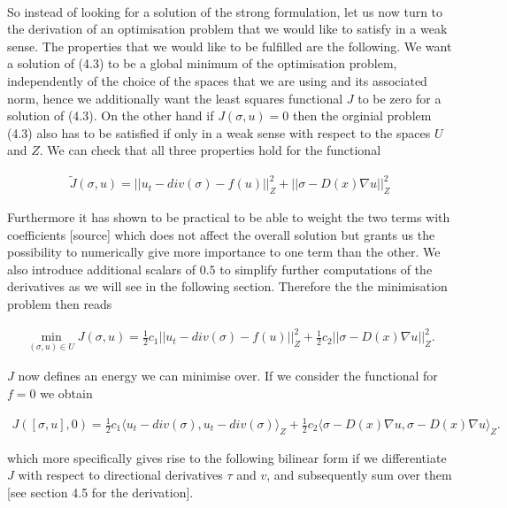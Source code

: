 \documentclass[../draft_1.tex]{subfiles}
\begin{document}
\smallskip
\\
So instead of looking for a solution of the strong formulation, let us now turn to the derivation of an optimisation problem that we would like to satisfy in a weak sense. The properties that we would like to be fulfilled are the following. We want a solution of (4.3) to be a global minimum of the optimisation problem, independently of the choice of the spaces that we are using and its associated norm, hence we additionally want the least squares functional $J$ to be zero for a solution of (4.3). On the other hand if $J(\sigma, u) = 0$ then the orginial problem (4.3) also has to be satisfied if only in a weak sense with respect to the spaces $U$ and $Z$. We can check that all three properties hold for the functional  
\begin{ceqn}
\begin{align}
\tilde{J}(\sigma, u) =|| u_t - div(\sigma) - f(u) ||_Z^2 + || \sigma - D(x) \nabla u || _Z^2
\end{align}
\end{ceqn}
Furthermore it has shown to be practical to be able to weight the two terms with coefficients [source] which does not affect the overall solution but grants us the possibility to numerically give more importance to one term than the other. We also introduce additional scalars of $0.5$ to simplify further computations of the derivatives as we will see in the following section. Therefore the the minimisation problem then reads
\begin{ceqn}
	\begin{align}
	\min_{(\sigma, u) \in U} J(\sigma, u) = \frac{1}{2} c_1 || u_t - div(\sigma) - f(u) ||_Z^2 + \frac{1}{2} c_2 || \sigma - D(x) \nabla u ||_Z^2.
	\end{align}
\end{ceqn}
$J$ now defines an energy we can minimise over. If we consider the functional for $ f = 0$ we obtain
\begin{ceqn}
	\begin{align}
J([\sigma, u], 0) = \frac{1}{2} c_1 \langle u_t - div(\sigma), u_t - div(\sigma)\rangle_Z + \frac{1}{2} c_2 \langle \sigma - D(x) \nabla u, \sigma - D(x) \nabla u \rangle_Z.
	\end{align}
\end{ceqn}
which more specifically gives rise to the following bilinear form if we differentiate $J$ with respect to directional derivatives $\tau$ and $v$, and subsequently sum over them [see section 4.5 for the derivation]. 
\end{document}
